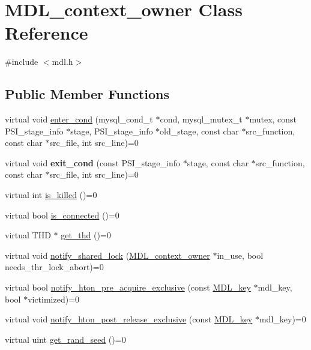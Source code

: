 \hypertarget{classMDL__context__owner}{}\section{M\+D\+L\+\_\+context\+\_\+owner Class Reference}
\label{classMDL__context__owner}


{\ttfamily \#include $<$mdl.\+h$>$}

\subsection*{Public Member Functions}
\begin{DoxyCompactItemize}
\item 
virtual void \mbox{\hyperlink{classMDL__context__owner_abac4e3f3e71847b2e0db7d64c89ab0b0}{enter\+\_\+cond}} (mysql\+\_\+cond\+\_\+t $\ast$cond, mysql\+\_\+mutex\+\_\+t $\ast$mutex, const P\+S\+I\+\_\+stage\+\_\+info $\ast$stage, P\+S\+I\+\_\+stage\+\_\+info $\ast$old\+\_\+stage, const char $\ast$src\+\_\+function, const char $\ast$src\+\_\+file, int src\+\_\+line)=0
\item 
\mbox{\label{classMDL__context__owner_a6cacf5fcbca060f6fc42edcd3901d4d5}} 
virtual void {\bfseries exit\+\_\+cond} (const P\+S\+I\+\_\+stage\+\_\+info $\ast$stage, const char $\ast$src\+\_\+function, const char $\ast$src\+\_\+file, int src\+\_\+line)=0
\item 
virtual int \mbox{\hyperlink{classMDL__context__owner_aa38a69293832e50edb8c194b0fc1c6e9}{is\+\_\+killed}} ()=0
\item 
virtual bool \mbox{\hyperlink{classMDL__context__owner_a189aa48c8373e98fcc412290c92226a8}{is\+\_\+connected}} ()=0
\item 
virtual T\+HD $\ast$ \mbox{\hyperlink{classMDL__context__owner_a6e93b957e332a9811d4a2d4195bd3e21}{get\+\_\+thd}} ()=0
\item 
virtual void \mbox{\hyperlink{classMDL__context__owner_a39cca8e5663058a27d0075811d238df4}{notify\+\_\+shared\+\_\+lock}} (\mbox{\hyperlink{classMDL__context__owner}{M\+D\+L\+\_\+context\+\_\+owner}} $\ast$in\+\_\+use, bool needs\+\_\+thr\+\_\+lock\+\_\+abort)=0
\item 
virtual bool \mbox{\hyperlink{classMDL__context__owner_a3f8c368fe7da7c6d8d0162f3617005be}{notify\+\_\+hton\+\_\+pre\+\_\+acquire\+\_\+exclusive}} (const \mbox{\hyperlink{structMDL__key}{M\+D\+L\+\_\+key}} $\ast$mdl\+\_\+key, bool $\ast$victimized)=0
\item 
virtual void \mbox{\hyperlink{classMDL__context__owner_a7e81e421fe965e530fd0c63d2f6c7dbd}{notify\+\_\+hton\+\_\+post\+\_\+release\+\_\+exclusive}} (const \mbox{\hyperlink{structMDL__key}{M\+D\+L\+\_\+key}} $\ast$mdl\+\_\+key)=0
\item 
virtual uint \mbox{\hyperlink{classMDL__context__owner_aeb463c745055a155a494c3989fffac74}{get\+\_\+rand\+\_\+seed}} ()=0
\end{DoxyCompactItemize}


